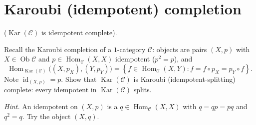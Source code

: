 \documentclass[11pt,a4paper]{article}
\newcounter{problem}
\begin{document}
	\section{Karoubi (idempotent) completion}
	\begin{problembox}[13]
		\label{prob.13}
		($\operatorname{Kar}(\mathcal{C})$ is idempotent complete).
		
		Recall the Karoubi completion of a $1$-category $\mathcal{C}$:
		objects are pairs $(X,p)$ with
		$X\in\operatorname{Ob}\mathcal{C}$ and
		$p\in\operatorname{Hom}_{\mathcal{C}}(X,X)$ idempotent
		($p^2=p$), and
		\[
		\operatorname{Hom}_{\operatorname{Kar}(\mathcal{C})}
		\bigl((X,p_X),(Y,p_Y)\bigr)
		=
		\left\{
		f\in\operatorname{Hom}_{\mathcal{C}}(X,Y)
		:
		f=f\circ p_X=p_Y\circ f
		\right\}.
		\]
		Note $\operatorname{id}_{(X,p)}=p$. Show that
		$\operatorname{Kar}(\mathcal{C})$ is Karoubi
		(idempotent-splitting) complete: every idempotent in
		$\operatorname{Kar}(\mathcal{C})$ splits.
		
		\textit{Hint.}
		An idempotent on $(X,p)$ is a
		$q\in\operatorname{Hom}_{\mathcal{C}}(X,X)$ with
		$q=qp=pq$ and $q^2=q$. Try the object $(X,q)$.
	\end{problembox}
\end{document}
